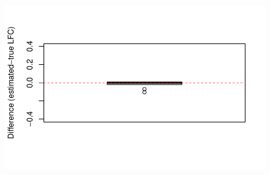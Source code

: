 \documentclass[
  letterpaper,
  DIV=11,
  numbers=noendperiod]{scrartcl}
\begin{document}
\begin{figure}[H]

{\centering \includegraphics{221215_simulationCLRBias_files/figure-pdf/unnamed-chunk-4-2.pdf}

}

\end{figure}
\end{document}
